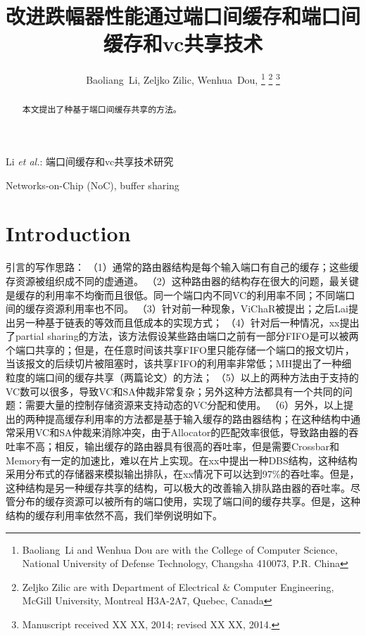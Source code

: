 ﻿\documentclass[10pt,journal]{IEEEtran}
\begin{document}
\title{改进跌幅器性能通过端口间缓存和端口间缓存和vc共享技术}

\author{Baoliang~Li, %
        Zeljko Zilic, %
        Wenhua~Dou, %
\thanks{Baoliang~Li and Wenhua Dou are with the College of Computer Science, National University of Defense Technology, Changsha 410073, P.R. China}%
\thanks{Zeljko Zilic are with Department of Electrical \& Computer Engineering, McGill University, Montreal H3A-2A7, Quebec, Canada}%
\thanks{Manuscript received XX XX, 2014; revised XX XX, 2014.}}

%
{Li \MakeLowercase{\textit{et al.}}: 端口间缓存和vc共享技术研究}

\maketitle

\begin{abstract}
本文提出了种基于端口间缓存共享的方法。
\end{abstract}
\begin{IEEEkeywords}
Networks-on-Chip (NoC), buffer sharing
\end{IEEEkeywords}

\section{Introduction}
引言的写作思路：
（1）通常的路由器结构是每个输入端口有自己的缓存；这些缓存资源被组织成不同的虚通道。
（2）这种路由器的结构存在很大的问题，最关键是缓存的利用率不均衡而且很低。同一个端口内不同VC的利用率不同；不同端口间的缓存资源利用率也不同。
（3）针对前一种现象，ViChaR被提出；之后Lai提出另一种基于链表的等效而且低成本的实现方式；
（4）针对后一种情况，xx提出了partial sharing的方法，该方法假设某些路由端口之前有一部分FIFO是可以被两个端口共享的；但是，在任意时间该共享FIFO里只能存储一个端口的报文切片，当该报文的后续切片被阻塞时，该共享FIFO的利用率非常低；MH提出了一种细粒度的端口间的缓存共享（两篇论文）的方法；
（5）以上的两种方法由于支持的VC数可以很多，导致VC和SA仲裁非常复杂；另外这种方法都具有一个共同的问题：需要大量的控制存储资源来支持动态的VC分配和使用。
（6）另外，以上提出的两种提高缓存利用率的方法都是基于输入缓存的路由器结构；在这种结构中通常采用VC和SA仲裁来消除冲突，由于Allocator的匹配效率很低，导致路由器的吞吐率不高；相反，输出缓存的路由器具有很高的吞吐率，但是需要Crossbar和Memory有一定的加速比，难以在片上实现。在xx中提出一种DBS结构，这种结构采用分布式的存储器来模拟输出排队，在xx情况下可以达到97\%的吞吐率。但是，这种结构是另一种缓存共享的结构，可以极大的改善输入排队路由器的吞吐率。尽管分布的缓存资源可以被所有的端口使用，实现了端口间的缓存共享。但是，这种结构的缓存利用率依然不高，我们举例说明如下。
\end{document}
